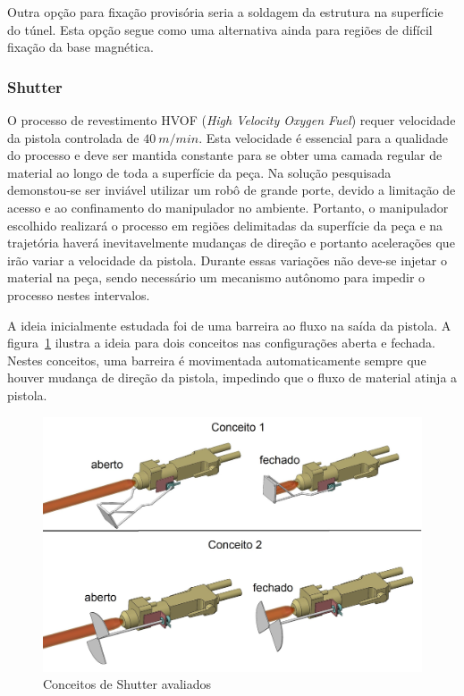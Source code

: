 Outra opção para fixação provisória seria a soldagem da estrutura na
superfície do túnel. Esta opção segue como uma alternativa ainda para regiões
de difícil fixação da base magnética.
  
\subsubsection{Shutter}%
O processo de revestimento HVOF (\textit{High Velocity Oxygen Fuel}) requer
velocidade da pistola controlada de $40~m/min$. Esta velocidade é essencial para
a qualidade do processo e deve ser mantida constante para se obter uma camada 
regular de material ao longo de toda a superfície da peça. Na solução
pesquisada demonstou-se ser inviável utilizar um robô de grande porte, devido a
limitação de acesso e ao confinamento do manipulador no ambiente. Portanto, o
manipulador  escolhido realizará o processo em regiões delimitadas da
superfície da peça e na trajetória haverá inevitavelmente mudanças de direção e
portanto acelerações que irão variar a velocidade da pistola. Durante essas
variações não deve-se injetar o material na peça, sendo necessário um mecanismo
autônomo para impedir o processo nestes intervalos.

A ideia inicialmente estudada foi de uma barreira ao fluxo na saída da pistola. 
A figura~\ref{fig::shutter_todos} ilustra a ideia para dois conceitos nas
configurações aberta e fechada. 
Nestes conceitos, uma barreira é movimentada automaticamente sempre que houver
mudança de direção da pistola, impedindo que o fluxo de material atinja a
pistola. 

\begin{figure}[h!]
   \centering
   \includegraphics[width=0.8\columnwidth]{figs/shutter/shutter_todos}
   \caption{Conceitos de Shutter avaliados}
   \label{fig::shutter_todos}
\end{figure}

